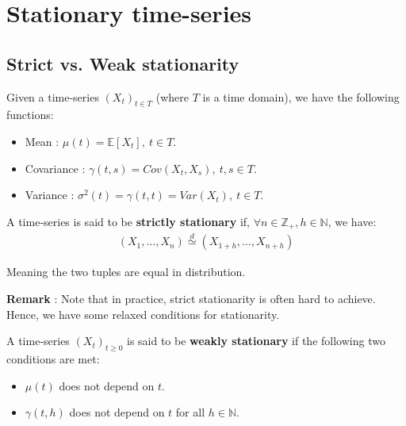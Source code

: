 \newpage
\section{Stationary time-series}
\subsection{Strict vs. Weak stationarity}

\begin{definition}
    Given a time-series $(X_t)_{t\in T}$ (where $T$ is a time domain), we have the following functions:
    \begin{itemize}
        \item Mean : $\mu(t)=\mathbb{E}[X_t], \ t\in T$.
        \item Covariance : $\gamma(t, s) = Cov(X_t, X_s), \ t, s\in T$.
        \item Variance : $\sigma^2(t) = \gamma(t,t)= Var(X_t), \ t\in T$.
    \end{itemize}
\end{definition}


\begin{definition}
    A time-series is said to be \textbf{strictly stationary} if, $\forall n \in \mathbb{Z}_+, h \in \mathbb{N}$, we have:
    \begin{align*}
        (X_1, \dots, X_n) \stackrel{d}{\simeq} (X_{1+h}, \dots, X_{n+h}) 
    \end{align*}

    \noindent Meaning the two tuples are equal in distribution.
\end{definition}

\noindent \textbf{Remark} : Note that in practice, strict stationarity is often hard to achieve. Hence, we have some relaxed conditions for stationarity.

\begin{definition}
    A time-series $(X_t)_{t\ge0}$ is said to be \textbf{weakly stationary} if the following two conditions are met:
    \begin{itemize}
        \item $\mu(t)$ does not depend on $t$.
        \item $\gamma(t, h)$ does not depend on $t$ for all $h\in\mathbb{N}$.
    \end{itemize}
\end{definition}

